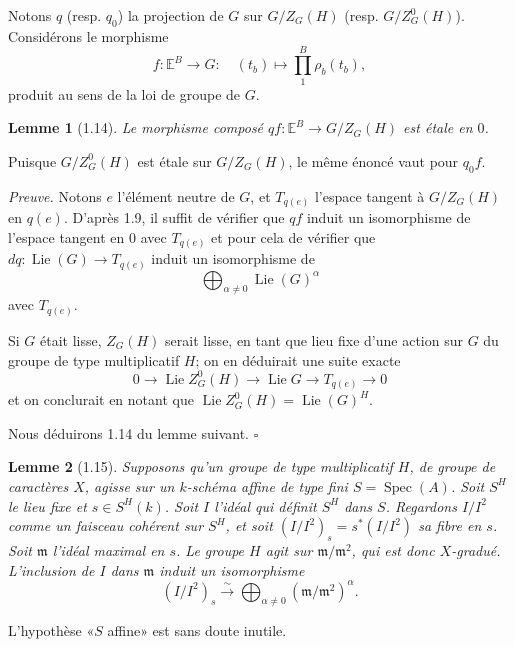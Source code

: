 \documentclass[10pt]{article}
\newcommand{\Spec}{\operatorname{Spec}}
\newcommand{\Lie}{\operatorname{Lie}}
\theoremstyle{deligne}
\newtheorem*{lemma*}{Lemme}
\newenvironment{proofdel}{\textit{Preuve.}}{\hfill$\square$}
\begin{document}
Notons \(q\) (resp. \(q_0\)) la projection de \(G\) sur \(G/Z_G(H)\) (resp. \(G/Z^0_G(H)\)). Considérons le morphisme
\[
  f:\mathbb E^B\longrightarrow G:\quad (t_b)\longmapsto \prod_{1}^{B}\rho_b(t_b),
\]
produit au sens de la loi de groupe de \(G\).

\begin{lemma*}[1.14]
Le morphisme composé \(qf:\mathbb E^B\to G/Z_G(H)\) est étale en \(0\).
\end{lemma*}

Puisque \(G/Z^0_G(H)\) est étale sur \(G/Z_G(H)\), le même énoncé vaut pour \(q_0f\).

\begin{proofdel}
Notons \(e\) l'élément neutre de \(G\), et \(T_{q(e)}\) l'espace tangent à \(G/Z_G(H)\) en \(q(e)\). D'après 1.9, il suffit de vérifier que \(qf\) induit un isomorphisme de l'espace tangent en \(0\) avec \(T_{q(e)}\) et pour cela de vérifier que \(dq:\Lie(G)\to T_{q(e)}\) induit un isomorphisme de
\[
  \bigoplus_{\alpha\ne0}\Lie(G)^\alpha
\]
avec \(T_{q(e)}\).

Si \(G\) était lisse, \(Z_G(H)\) serait lisse, en tant que lieu fixe d'une action sur \(G\) du groupe de type multiplicatif \(H\); on en déduirait une suite exacte
\[
  0\longrightarrow \Lie Z^0_G(H)\longrightarrow \Lie G\longrightarrow T_{q(e)}\longrightarrow0
\]
et on conclurait en notant que \(\Lie Z^0_G(H)=\Lie(G)^H\).

Nous déduirons 1.14 du lemme suivant.
\end{proofdel}

\begin{lemma*}[1.15]
Supposons qu'un groupe de type multiplicatif \(H\), de groupe de caractères \(X\), agisse sur un \(k\)-schéma affine de type fini \(S=\Spec(A)\). Soit \(S^H\) le lieu fixe et \(s\in S^H(k)\). Soit \(I\) l'idéal qui définit \(S^H\) dans \(S\). Regardons \(I/I^2\) comme un faisceau cohérent sur \(S^H\), et soit \((I/I^2)_s=s^*(I/I^2)\) sa fibre en \(s\). Soit \(\mathfrak m\) l'idéal maximal en \(s\). Le groupe \(H\) agit sur \(\mathfrak m/\mathfrak m^2\), qui est donc \(X\)-gradué. L'inclusion de \(I\) dans \(\mathfrak m\) induit un isomorphisme
\[
  (I/I^2)_s \overset{\sim}{\longrightarrow}
  \bigoplus_{\alpha\ne0}(\mathfrak m/\mathfrak m^2)^\alpha .
  \tag{1.15.1}
\]
\end{lemma*}

L'hypothèse «\(S\) affine» est sans doute inutile.
\end{document}
